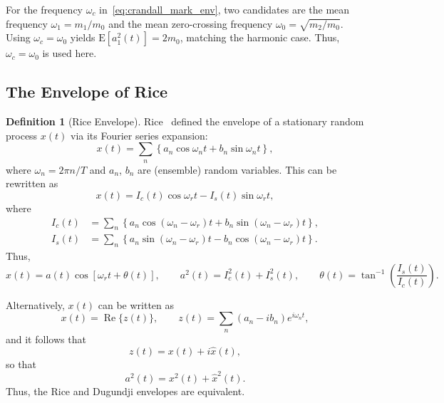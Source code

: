 \documentclass[12pt]{article}
\theoremstyle{plain}
\theoremstyle{definition}
\newtheorem{definition}{Definition}[section]
\theoremstyle{remark}
\theoremstyle{plain}
\theoremstyle{definition}
\begin{document}
For the frequency $\omega_c$ in~\eqref{eq:crandall_mark_env}, two candidates are the mean frequency $\omega_1 = m_1/m_0$ and the mean zero-crossing frequency $\omega_0 = \sqrt{m_2/m_0}$. Using $\omega_c = \omega_0$ yields $\mathrm{E}[a_1^2(t)] = 2 m_0$, matching the harmonic case. Thus, $\omega_c = \omega_0$ is used here.

\subsection{The Envelope of Rice}
\label{sec:rice}
\begin{definition}[Rice Envelope]\label{def:rice}
Rice~\cite{rice1954} defined the envelope of a stationary random process $x(t)$ via its Fourier series expansion:
\begin{equation}
    x(t) = \sum_n \left\{ a_n \cos \omega_n t + b_n \sin \omega_n t \right\},
    \label{eq:fourier}
\end{equation}
where $\omega_n = 2\pi n / T$ and $a_n$, $b_n$ are (ensemble) random variables. This can be rewritten as
\begin{equation}
    x(t) = I_c(t) \cos \omega_r t - I_s(t) \sin \omega_r t,
    \label{eq:rice_cos_sin}
\end{equation}
where
\begin{align}
    I_c(t) &= \sum_n \left\{ a_n \cos (\omega_n - \omega_r)t + b_n \sin (\omega_n - \omega_r)t \right\}, \\
    I_s(t) &= \sum_n \left\{ a_n \sin (\omega_n - \omega_r)t - b_n \cos (\omega_n - \omega_r)t \right\}.
\end{align}
Thus,
\begin{equation}
    x(t) = a(t) \cos [\omega_r t + \theta(t)], \qquad a^2(t) = I_c^2(t) + I_s^2(t), \qquad \theta(t) = \tan^{-1}\left(\frac{I_s(t)}{I_c(t)}\right).
    \label{eq:rice_env}
\end{equation}
\end{definition}

Alternatively, $x(t)$ can be written as
\begin{equation}
    x(t) = \operatorname{Re}\{z(t)\}, \qquad z(t) = \sum_n (a_n - i b_n) e^{i \omega_n t},
\end{equation}
and it follows that
\begin{equation}
    z(t) = x(t) + i \hat{x}(t),
\end{equation}
so that
\begin{equation}
    a^2(t) = x^2(t) + \hat{x}^2(t).
    \label{eq:rice_dugundji_equiv}
\end{equation}
Thus, the Rice and Dugundji envelopes are equivalent.
\end{document}

